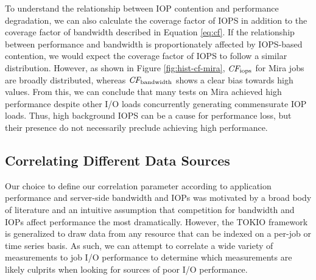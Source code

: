 {To understand the relationship between IOP contention and performance degradation, we can also calculate the coverage factor of IOPS in addition to the coverage factor of bandwidth described in Equation \ref{eq:cf}.
If the relationship between performance and bandwidth is proportionately affected by IOPS-based contention, we would expect the coverage factor of IOPS to follow a similar distribution.
However, as shown in Figure \ref{fig:hist-cf-mira}, $\textit{CF}_{\textup{iops}}$ for Mira jobs are broadly distributed, whereas $\textit{CF}_{\textup{bandwidth}}$ shows a clear bias towards high values.
From this, we can conclude that many tests on Mira achieved high performance despite other I/O loads concurrently generating commensurate IOP loads.
Thus, high background IOPS can be a cause for performance loss, but their presence do not necessarily preclude achieving high performance.


\subsection{Correlating Different Data Sources} \label{sec:results/correlating}


Our choice to define our correlation parameter according to application performance and server-side bandwidth and IOPs was motivated by a broad body of literature and an intuitive assumption that competition for bandwidth and IOPs affect performance the most dramatically.
However, the TOKIO framework is generalized to draw data from any resource that can be indexed on a per-job or time series basis.
As such, we can attempt to correlate a wide variety of measurements to job I/O performance to determine which measurements are likely culprits when looking for sources of poor I/O performance.

}
